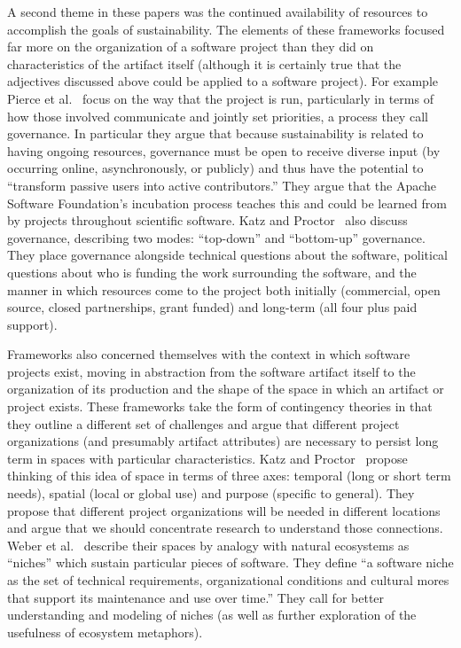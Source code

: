 \documentclass[11pt, oneside]{amsart}
\begin{document}
A second theme in these papers was the continued availability of
resources to accomplish the goals of sustainability. The elements of
these frameworks focused far more on the organization of a software
project than they did on characteristics of the artifact itself
(although it is certainly true that the adjectives discussed above
could be applied to a software project). For example Pierce et
al.~\cite{Pierce_WSSSPE} focus on the way that the project is run,
particularly in terms of how those involved communicate and jointly
set priorities, a process they call governance. In particular they
argue that because sustainability is related to having ongoing resources,
governance must be open to receive diverse input (by occurring online,
asynchronously, or publicly) and thus have the potential to
``transform passive users into active contributors.'' They argue that
the Apache Software Foundation's incubation process teaches this and
could be learned from by projects throughout scientific software.
Katz and Proctor~\cite{Katz_WSSSPE} also discuss governance,
describing two modes: ``top-down'' and ``bottom-up'' governance.  They
place governance alongside technical questions about the software,
political questions about who is funding
the work surrounding the software, and the
manner in which resources come to the project both initially (commercial,
open source, closed partnerships, grant funded) and long-term (all
four plus paid support).

Frameworks also concerned themselves with the context in which
software projects exist, moving in abstraction from the software
artifact itself to the organization of its production and the shape of
the space in which an artifact or project exists.  These frameworks
take the form of contingency theories in that they outline a different
set of challenges and argue that different project organizations (and
presumably artifact attributes) are necessary to persist long term in
spaces with particular characteristics.  Katz and
Proctor~\cite{Katz_WSSSPE} propose thinking of this idea of space in
terms of three axes: temporal (long or short term needs), spatial
(local or global use) and purpose (specific to general).  They propose
that different project organizations will be needed in different
locations and argue that we should concentrate research to understand
those connections. Weber et al.~\cite{Weber_WSSSPE} describe their
spaces by analogy with natural ecosystems as ``niches'' which sustain
particular pieces of software. They define ``a software niche as the
set of technical requirements, organizational conditions and cultural
mores that support its maintenance and use over time.'' They call for
better understanding and modeling of niches (as well as further
exploration of the usefulness of ecosystem metaphors).
\end{document}
